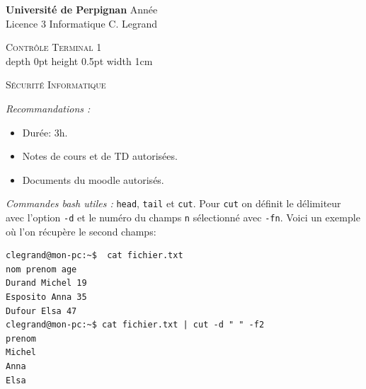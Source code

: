 \documentclass[a4paper,9pt]{article}
\newenvironment{terminal}{\color{white}\begin{snugshade*}}
{\end{snugshade*}\color{black}}
\theoremstyle{plain}
\theoremstyle{definition}
\begin{document}
\hbox{}
\noindent \textbf{Université de Perpignan} \hfill  Année \the\year \\
Licence 3 Informatique \hfill C. Legrand \\

\begin{center}
  {  {\scshape \large Contrôle Terminal 1} \\
    \vrule depth 0pt height 0.5pt width 1cm
    \medskip
    
{\scshape    S\'ecurit\'e Informatique}  \\
}
\end{center}
\hbox{}

\bigskip

\bigskip


\noindent\textit{Recommandations :}
\begin{itemize}
\item Durée: 3h.
\item Notes de cours et de TD autorisées.
  \item Documents du moodle autorisés. 
  \end{itemize}
\noindent\textit{Commandes bash utiles :} \verb|head|, \verb|tail| et \verb|cut|. Pour \verb|cut| on définit le délimiteur avec l'option \verb|-d| et le numéro du champs \verb|n| sélectionné avec \verb|-fn|.  Voici un exemple où l'on récupère le second champs:
\begin{small}
\begin{terminal}
\begin{verbatim}
clegrand@mon-pc:~$  cat fichier.txt 
nom prenom age
Durand Michel 19
Esposito Anna 35
Dufour Elsa 47
clegrand@mon-pc:~$ cat fichier.txt | cut -d " " -f2
prenom
Michel
Anna
Elsa
\end{verbatim}
\end{terminal}
\end{small}
\end{document}
